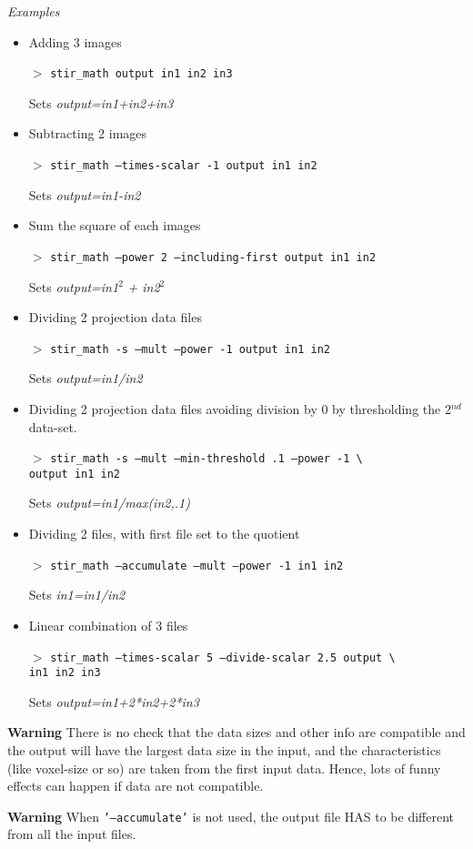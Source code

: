 \documentclass{article}
\newcommand{\cmdline}[1]{\par \noindent $>$ \texttt{#1}\par}
\begin{document}
\textit{Examples}
\begin{itemize}
\item
Adding 3 images
\cmdline{stir\_math output in1 in2 in3}

Sets \textit{output=in1+in2+in3}\\
\item
Subtracting 2 images
\cmdline{stir\_math --times-scalar -1 output in1 in2}


Sets \textit{output=in1-in2}\\
\item
Sum the square of each images
\cmdline{stir\_math --power 2 --including-first output in1 in2}


Sets \textit{output=in1}$^{\mathit{2}}$ \textit{+ in2}$^{\mathit{2}}$\\
\item
Dividing 2 projection data files
\cmdline{stir\_math -s --mult --power -1 output in1 in2}


Sets \textit{output=in1/in2}\\
\item
Dividing 2 projection data files avoiding division by 0 by thresholding 
the 2$^{nd}$ data-set.
\cmdline{stir\_math -s --mult --min-threshold .1 --power -1 {\textbackslash}\\
output in1 in2}


Sets \textit{output=in1/max(in2,.1)}\\
\item
Dividing 2 files, with first file set to the quotient
\cmdline{stir\_math --accumulate --mult --power -1 in1 in2}


Sets \textit{in1=in1/in2}\\
\item
Linear combination of 3 files
\cmdline{stir\_math --times-scalar 5 --divide-scalar 2.5 output {\textbackslash}\\
in1 in2 in3}


Sets \textit{output=in1+2*in2+2*in3}
\end{itemize}

\textbf{Warning} There is no check that the data sizes and other info 
are compatible and the output will have the largest data size 
in the input, and the characteristics (like voxel-size or so) 
are taken from the first input data. Hence, lots of funny effects 
can happen if data are not compatible.


\textbf{Warning} When \texttt{'--accumulate'} is not used, the output file 
HAS to be different from all the input files.
\end{document}
